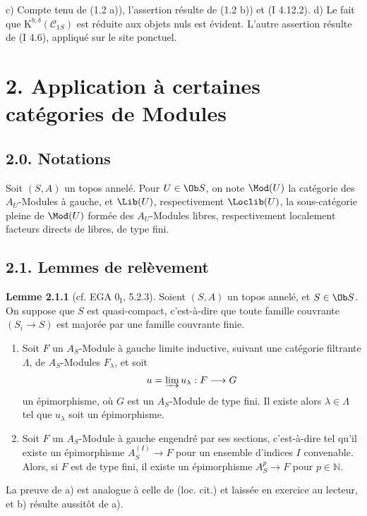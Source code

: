 \documentclass[11pt]{article}
\begin{document}
c) Compte tenu de (1.2 a)), l'assertion résulte de (1.2 b)) et (I 4.12.2). d) Le fait que $\mathrm K^{b,\delta}(\mathcal C_{1S})$ est réduite aux objets nuls est évident. L'autre assertion résulte de (I 4.6), appliqué sur le site ponctuel.

\section*{2. Application à certaines catégories de Modules}
\subsection*{2.0. Notations}
Soit $(S,A)$ un topos annelé. Pour $U\in\Ob S$, on note $\Mod(U)$ la catégorie des $A_U$-Modules à gauche, et $\Lib(U)$, respectivement $\Loclib(U)$, la sous-catégorie pleine de $\Mod(U)$ formée des $A_U$-Modules libres, respectivement localement facteurs directs de libres, de type fini.

\subsection*{2.1. Lemmes de relèvement}

\textbf{Lemme 2.1.1} (cf. EGA $0_{\mathrm I}$, 5.2.3). Soient $(S,A)$ un topos annelé, et $S\in\Ob S$. On suppose que $S$ est quasi-compact, c'est-à-dire que toute famille couvrante $(S_i\to S)$ est majorée par une famille couvrante finie.
\begin{enumerate}[label=\alph*)]
\item Soit $F$ un $A_S$-Module à gauche limite inductive, suivant une catégorie filtrante $\Lambda$, de $A_S$-Modules $F_\lambda$, et soit
\[
u=\varinjlim u_\lambda:F\longrightarrow G
\]
un épimorphisme, où $G$ est un $A_S$-Module de type fini. Il existe alors $\lambda\in\Lambda$ tel que $u_\lambda$ soit un épimorphisme.
\item Soit $F$ un $A_S$-Module à gauche engendré par ses sections, c'est-à-dire tel qu'il existe un épimorphisme $A_S^{(I)}\to F$ pour un ensemble d'indices $I$ convenable. Alors, si $F$ est de type fini, il existe un épimorphisme $A_S^p\to F$ pour $p\in\mathbb N$.
\end{enumerate}
La preuve de a) est analogue à celle de (loc. cit.) et laissée en exercice au lecteur, et b) résulte aussitôt de a).
\end{document}
